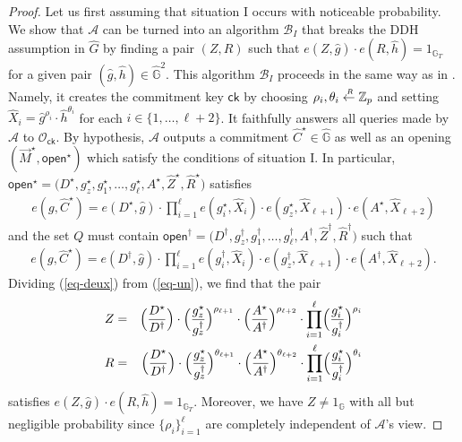 \documentclass[10pt]{llncs}
\newcommand{\A}{\mathcal{A}}
\newcommand{\B}{\mathcal{B}}
\newcommand{\G}{\mathbb{G}}
\newcommand{\Z}{\mathbb{Z}}
\newcommand{\ck}{\mathsf{ck}}
\newcommand{\open}{\mathsf{open}}
\newcommand{\sample}{\stackrel{{\scriptscriptstyle \mkern4mu R}}{\gets}}
\begin{document}
\begin{proof}
Let us first assuming that situation I occurs with noticeable probability. We show that $\A$ can be turned into an algorithm $\B_I$ that breaks the DDH 
assumption in $\hat{G}$ by finding a pair $(Z,R)$ such that $e(Z,\hat{g}) \cdot e(R,\hat{h}) = 1_{\G_T}$ for a given pair 
$(\hat{g},\hat{h}) \in \hat{\G}^2$.  This algorithm $\B_I$ proceeds in the same way as in 
\cite{DBLP:conf/eurocrypt/AbeKOT15}. Namely, it creates the commitment key $\ck$ by choosing $\rho_i,\theta_i \sample \Z_p$ 
and setting $\hat{X}_i=\hat{g}^{\rho_i} \cdot \hat{h}^{\theta_i}$ for each $i \in \{1,\ldots , \ell+2 \}$.  It faithfully answers all queries 
made by $\A$ to $\mathcal{O}_{\ck}$. By hypothesis, $\A$ outputs a commitment $\hat{C}^\star \in \hat{\G}$ as well as an opening $(\vec{M}^\star,\open^\star)$ 
which satisfy the conditions of situation I.  In particular, $\open^\star  = \big( D^\star, g_z^\star, g_1^\star, \ldots, g_\ell^\star, A^\star , \hat{Z}^\star , \hat{R}^\star \big)$ satisfies 
\begin{eqnarray} \label{eq-un}
   e(g, \hat{C}^\star)  = e(D^\star, \hat{g}) \cdot \prod_{i = 1}^{\ell} e(g_i^\star, \hat{X}_i) \cdot 
e(g_z^\star, \hat{X}_{\ell+1}) \cdot e(A^\star ,\hat{X}_{\ell+2}) 
\end{eqnarray}
and the set $Q$ must contain $\open^\dagger  = \big( D^\dagger, g_z^\dagger, g_1^\dagger, \ldots, g_\ell^\dagger, A^\dagger , \hat{Z}^\dagger, \hat{R}^\dagger \big)$ such that 
\begin{eqnarray} \label{eq-deux}
   e(g, \hat{C}^\star)  = e(D^\dagger, \hat{g}) \cdot \prod_{i = 1}^{\ell} e(g_i^\dagger, \hat{X}_i) \cdot 
e(g_z^\dagger, \hat{X}_{\ell+1}) \cdot e(A^\dagger ,\hat{X}_{\ell+2}) .
\end{eqnarray}
Dividing (\ref{eq-deux}) from (\ref{eq-un}), we find that the pair 
\begin{eqnarray*}
Z &=& \Bigl( \frac{D^\star }{D^\dagger}   \Bigr) \cdot 
 \Bigl( \frac{g_{z}^\star }{g_{z}^\dagger } \Bigr)^{ \rho_{\ell+1}} \cdot   \Bigl( \frac{A^\star }{A^\dagger } \Bigr)^{ \rho_{\ell+2}} \cdot \prod_{i=1}^\ell \Bigl( \frac{g_i^\star }{g_i^\dagger} \Bigr)^{ \rho_i}  \\
R &=& \Bigl( \frac{D^\star }{D^\dagger}   \Bigr) \cdot 
 \Bigl( \frac{g_{z}^\star }{g_{z}^\dagger } \Bigr)^{ \theta_{\ell+1}} \cdot   \Bigl( \frac{A^\star }{A^\dagger } \Bigr)^{ \theta_{\ell+2}} \cdot \prod_{i=1}^\ell \Bigl( \frac{g_i^\star }{g_i^\dagger} \Bigr)^{ \theta_i}  \\
\end{eqnarray*}
satisfies  $e(Z,\hat{g}) \cdot e(R,\hat{h}) = 1_{\G_T}$. Moreover, we  have $Z \neq 1_\G$ with all but negligible probability since 
$\{\rho_i\}_{i=1}^\ell$ are completely independent of $\A$'s view.  \medskip 


\end{proof}
\end{document}
